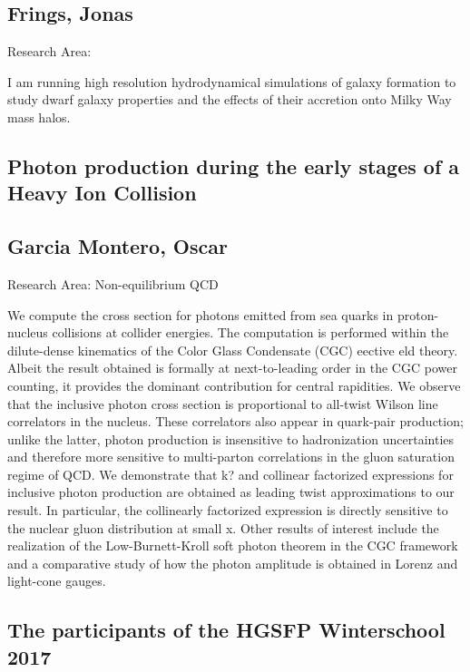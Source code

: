 \subsection*{\centering \normalsize Frings, Jonas}
Research Area: \newline

\noindent I am running high resolution hydrodynamical simulations of galaxy formation to study dwarf galaxy properties and the effects of their accretion onto Milky Way mass halos.

\newpage
\subsection*{\centering \large Photon production during the early stages of a Heavy Ion Collision}
\subsection*{\centering \normalsize Garcia Montero, Oscar}
Research Area: Non-equilibrium QCD\newline

\noindent We compute the cross section for photons emitted from sea quarks in proton-nucleus collisions at collider energies. The computation is performed within the dilute-dense kinematics of the Color Glass Condensate (CGC) eective eld theory. Albeit the result obtained is formally at next-to-leading order in the CGC power counting, it provides the dominant contribution for central rapidities. We observe that the inclusive photon cross section is proportional to all-twist Wilson line correlators in the nucleus. These correlators also appear in quark-pair production; unlike the latter, photon production is insensitive to hadronization uncertainties and therefore more sensitive to multi-parton correlations in the gluon saturation regime of QCD. We demonstrate that k? and collinear factorized expressions for inclusive photon production are obtained as leading twist approximations to our result. In particular, the collinearly factorized expression is directly sensitive to the nuclear gluon distribution at small x. Other results of interest include the realization of the Low-Burnett-Kroll soft photon theorem in the CGC framework and a comparative study of how the photon amplitude is obtained in Lorenz and light-cone gauges.

\subsection*{\centering\normalsize The participants of the HGSFP Winterschool 2017}
